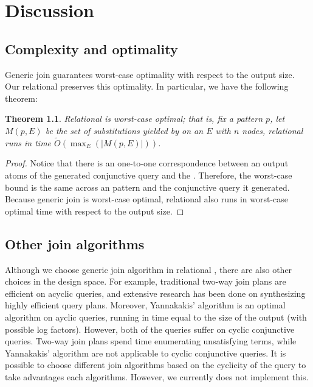 \chapter{Discussion}

\section{Complexity and optimality}
\label{sec:disc:complexity}

Generic join guarantees worst-case optimality with respect to the output size.
Our relational \ematching preserves this optimality. In particular, we have the following theorem:
\newtheorem{theorem}{Theorem}
\begin{theorem}
Relational \ematching is worst-case optimal; that is, fix a pattern $p$, let $M(p,E)$ be the set of substitutions yielded by \ematching on an \egraph $E$ with $n$ nodes, relational \ematching runs in time $\tilde O(\max_E(|M(p,E)|))$.
\end{theorem}
\begin{proof}

Notice that there is an one-to-one correspondence between an output atoms of the generated conjunctive query and the \ematching. Therefore, the worst-case bound is the same across an \ematching pattern and the conjunctive query it generated. Because generic join is worst-case optimal, relational \ematching also runs in worst-case optimal time with respect to the output size.
\end{proof}


\section{Other join algorithms}

Although we choose generic join algorithm in relational \ematching, there are also other choices in the design space. For example, traditional two-way join plans are efficient on acyclic queries, and extensive research has been done on synthesizing highly efficient query plans. Moreover, Yannakakis' algorithm \citep{yannakakis} is an optimal algorithm on ayclic queries, running in time equal to the size of the output (with possible log factors). However, both of the queries suffer on cyclic conjunctive queries. Two-way join plans spend time enumerating unsatisfying terms, while Yannakakis' algorithm are not applicable to cyclic conjunctive queries. It is possible to choose different join algorithms based on the cyclicity of the query to take advantages each algorithms. However, we currently does not implement this.

